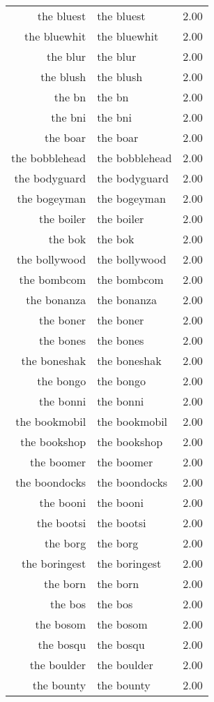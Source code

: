 \begin{table}[ht]
\begin{tabular}{rlr}
  the bluest & the bluest & 2.00 \\ 
  the bluewhit & the bluewhit & 2.00 \\ 
  the blur & the blur & 2.00 \\ 
  the blush & the blush & 2.00 \\ 
  the bn & the bn & 2.00 \\ 
  the bni & the bni & 2.00 \\ 
  the boar & the boar & 2.00 \\ 
  the bobblehead & the bobblehead & 2.00 \\ 
  the bodyguard & the bodyguard & 2.00 \\ 
  the bogeyman & the bogeyman & 2.00 \\ 
  the boiler & the boiler & 2.00 \\ 
  the bok & the bok & 2.00 \\ 
  the bollywood & the bollywood & 2.00 \\ 
  the bombcom & the bombcom & 2.00 \\ 
  the bonanza & the bonanza & 2.00 \\ 
  the boner & the boner & 2.00 \\ 
  the bones & the bones & 2.00 \\ 
  the boneshak & the boneshak & 2.00 \\ 
  the bongo & the bongo & 2.00 \\ 
  the bonni & the bonni & 2.00 \\ 
  the bookmobil & the bookmobil & 2.00 \\ 
  the bookshop & the bookshop & 2.00 \\ 
  the boomer & the boomer & 2.00 \\ 
  the boondocks & the boondocks & 2.00 \\ 
  the booni & the booni & 2.00 \\ 
  the bootsi & the bootsi & 2.00 \\ 
  the borg & the borg & 2.00 \\ 
  the boringest & the boringest & 2.00 \\ 
  the born & the born & 2.00 \\ 
  the bos & the bos & 2.00 \\ 
  the bosom & the bosom & 2.00 \\ 
  the bosqu & the bosqu & 2.00 \\ 
  the boulder & the boulder & 2.00 \\ 
  the bounty & the bounty & 2.00 \\ 

\end{tabular}
\end{table}
